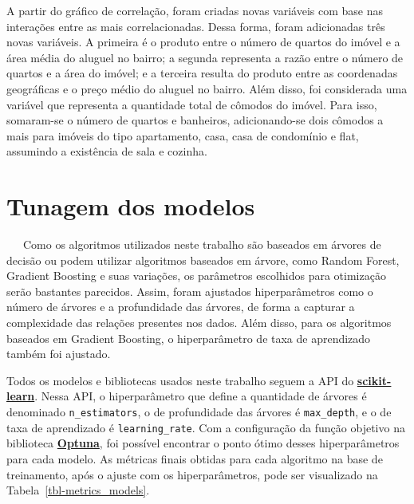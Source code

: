 \documentclass[
  12pt,
  a4paper,
]{scrreprt}
\begin{document}
\vspace{12pt}

A partir do gráfico de correlação, foram criadas novas variáveis com
base nas interações entre as mais correlacionadas. Dessa forma, foram
adicionadas três novas variáveis. A primeira é o produto entre o número
de quartos do imóvel e a área média do aluguel no bairro; a segunda
representa a razão entre o número de quartos e a área do imóvel; e a
terceira resulta do produto entre as coordenadas geográficas e o preço
médio do aluguel no bairro. Além disso, foi considerada uma variável que
representa a quantidade total de cômodos do imóvel. Para isso,
somaram-se o número de quartos e banheiros, adicionando-se dois cômodos
a mais para imóveis do tipo apartamento, casa, casa de condomínio e
flat, assumindo a existência de sala e cozinha.

\section{Tunagem dos modelos}\label{tunagem-dos-modelos}

~~~Como os algoritmos utilizados neste trabalho são baseados em árvores
de decisão ou podem utilizar algoritmos baseados em árvore, como Random
Forest, Gradient Boosting e suas variações, os parâmetros escolhidos
para otimização serão bastantes parecidos. Assim, foram ajustados
hiperparâmetros como o número de árvores e a profundidade das árvores,
de forma a capturar a complexidade das relações presentes nos dados.
Além disso, para os algoritmos baseados em Gradient Boosting, o
hiperparâmetro de taxa de aprendizado também foi ajustado.

\vspace{12pt}

Todos os modelos e bibliotecas usados neste trabalho seguem a API do
\href{https://scikit-learn.org/stable/}{\textbf{scikit-learn}}. Nessa
API, o hiperparâmetro que define a quantidade de árvores é denominado
\texttt{n\_estimators}, o de profundidade das árvores é
\texttt{max\_depth}, e o de taxa de aprendizado é
\texttt{learning\_rate}. Com a configuração da função objetivo na
biblioteca \href{https://optuna.org/}{\textbf{Optuna}}, foi possível
encontrar o ponto ótimo desses hiperparâmetros para cada modelo. As
métricas finais obtidas para cada algoritmo na base de treinamento, após
o ajuste com os hiperparâmetros, pode ser visualizado na
Tabela~\ref{tbl-metrics_models}.
\end{document}
